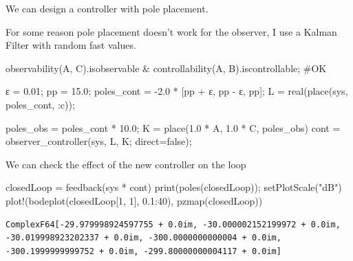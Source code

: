 \documentclass[
  a4paper,
  DIV=11,
  numbers=noendperiod]{scrreprt}
\newenvironment{Shaded}{\begin{snugshade}}{\end{snugshade}}
\newcommand{\CharTok}[1]{\textcolor[rgb]{0.13,0.47,0.30}{#1}}
\newcommand{\CommentTok}[1]{\textcolor[rgb]{0.37,0.37,0.37}{#1}}
\newcommand{\ConstantTok}[1]{\textcolor[rgb]{0.56,0.35,0.01}{#1}}
\newcommand{\FloatTok}[1]{\textcolor[rgb]{0.68,0.00,0.00}{#1}}
\newcommand{\FunctionTok}[1]{\textcolor[rgb]{0.28,0.35,0.67}{#1}}
\newcommand{\NormalTok}[1]{\textcolor[rgb]{0.00,0.23,0.31}{#1}}
\newcommand{\OperatorTok}[1]{\textcolor[rgb]{0.37,0.37,0.37}{#1}}
\newcommand{\StringTok}[1]{\textcolor[rgb]{0.13,0.47,0.30}{#1}}
\begin{document}
We can design a controller with pole placement.

For some reason pole placement doesn't work for the observer, I use a
Kalman Filter with random fast values.

\begin{Shaded}
\begin{Highlighting}[]
\FunctionTok{observability}\NormalTok{(A, C).isobservable }\OperatorTok{\&} 
\FunctionTok{controllability}\NormalTok{(A, B).iscontrollable; }\CommentTok{\#OK}

\NormalTok{ε }\OperatorTok{=} \FloatTok{0.01}\NormalTok{;}
\NormalTok{pp }\OperatorTok{=} \FloatTok{15.0}\NormalTok{;}
\NormalTok{poles\_cont }\OperatorTok{=} \OperatorTok{{-}}\FloatTok{2.0} \OperatorTok{*}\NormalTok{ [pp }\OperatorTok{+}\NormalTok{ ε, pp }\OperatorTok{{-}}\NormalTok{ ε, pp];}
\NormalTok{L }\OperatorTok{=} \FunctionTok{real}\NormalTok{(}\FunctionTok{place}\NormalTok{(sys, poles\_cont, }\OperatorTok{:}\NormalTok{c));}

\NormalTok{poles\_obs }\OperatorTok{=}\NormalTok{ poles\_cont }\OperatorTok{*} \FloatTok{10.0}\NormalTok{;}
\NormalTok{K }\OperatorTok{=} \FunctionTok{place}\NormalTok{(}\FloatTok{1.0} \OperatorTok{*}\NormalTok{ A}\OperatorTok{\textquotesingle{}}\NormalTok{, }\FloatTok{1.0} \OperatorTok{*}\NormalTok{ C}\OperatorTok{\textquotesingle{}}\NormalTok{, poles\_obs)}\CharTok{\textquotesingle{}}
\NormalTok{cont }\OperatorTok{=} \FunctionTok{observer\_controller}\NormalTok{(sys, L, K; direct}\OperatorTok{=}\ConstantTok{false}\NormalTok{);}
\end{Highlighting}
\end{Shaded}

We can check the effect of the new controller on the loop

\begin{Shaded}
\begin{Highlighting}[]
\NormalTok{closedLoop }\OperatorTok{=} \FunctionTok{feedback}\NormalTok{(sys }\OperatorTok{*}\NormalTok{ cont)}
\FunctionTok{print}\NormalTok{(}\FunctionTok{poles}\NormalTok{(closedLoop));}
\FunctionTok{setPlotScale}\NormalTok{(}\StringTok{"dB"}\NormalTok{)}
\FunctionTok{plot!}\NormalTok{(}\FunctionTok{bodeplot}\NormalTok{(closedLoop[}\FloatTok{1}\NormalTok{, }\FloatTok{1}\NormalTok{], }\FloatTok{0.1}\OperatorTok{:}\FloatTok{40}\NormalTok{), }\FunctionTok{pzmap}\NormalTok{(closedLoop))}
\end{Highlighting}
\end{Shaded}

\begin{verbatim}
ComplexF64[-29.979998924597755 + 0.0im, -30.000002152199972 + 0.0im, -30.019998923202337 + 0.0im, -300.0000000000004 + 0.0im, -300.1999999999752 + 0.0im, -299.80000000004117 + 0.0im]
\end{verbatim}
\end{document}
